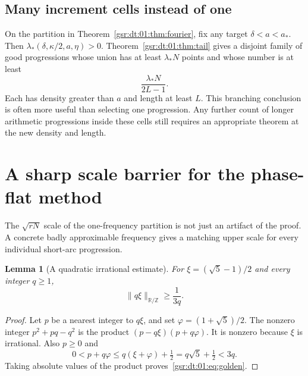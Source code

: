 \documentclass[11pt,letterpaper]{article}
\numberwithin{equation}{section}
\newtheorem{lemma}[theorem]{Lemma}
\theoremstyle{definition}
\theoremstyle{remark}
\newcommand{\R}{\mathbb R}
\newcommand{\Z}{\mathbb Z}
\newcommand{\1}{\mathbf 1}
\newcommand{\srctag}[1]{\texorpdfstring{\enspace\textup{[#1]}}{ [#1]}}
\newcommand{\srcnote}[2]{\par\noindent{\small\textit{Source #1, delivered #2.}}\par}
\begin{document}
\subsection{Many increment cells instead of one}
On the partition in Theorem~\ref{gsr:dt:01:thm:fourier}, fix any target
$\delta<a<a_*$. Then $\lambda_*(\delta,\kappa/2,a,\eta)>0$.
Theorem~\ref{gsr:dt:01:thm:tail} gives a disjoint family of good progressions whose
union has at least $\lambda_*N$ points and whose number is at least
\[
 \frac{\lambda_*N}{2L-1}.
\]
Each has density greater than $a$ and length at least $L$. This branching
conclusion is often more useful than selecting one progression. Any
further count of longer arithmetic progressions inside these cells still
requires an appropriate theorem at the new density and length.

\section[{A sharp scale barrier for the phase-flat method\srctag{01}}]{A sharp scale barrier for the phase-flat method}\label{gsr:dt:01:sec:d8}\label{gsr:dt:01:sec:barrier}
\srcnote{01}{Section 8}

The $\sqrt{rN}$ scale of the one-frequency partition is not just an
artifact of the proof. A concrete badly approximable frequency gives a
matching upper scale for every individual short-arc progression.

\begin{lemma}[A quadratic irrational estimate]\label{gsr:dt:01:lem:golden}
For $\xi=(\sqrt5-1)/2$ and every integer $q\ge1$,
\begin{equation}\label{gsr:dt:01:eq:golden}
 \|q\xi\|_{\R/\Z}\ge\frac1{3q}.
\end{equation}
\end{lemma}
\begin{proof}
Let $p$ be a nearest integer to $q\xi$, and set
$\varphi=(1+\sqrt5)/2$. The nonzero integer
$p^2+pq-q^2$ is the product $(p-q\xi)(p+q\varphi)$.
It is nonzero because $\xi$ is irrational. Also $p\ge0$ and
\[
 0<p+q\varphi\le q(\xi+\varphi)+\tfrac12
  =q\sqrt5+\tfrac12<3q.
\]
Taking absolute values of the product proves~\eqref{gsr:dt:01:eq:golden}.
\end{proof}
\end{document}
